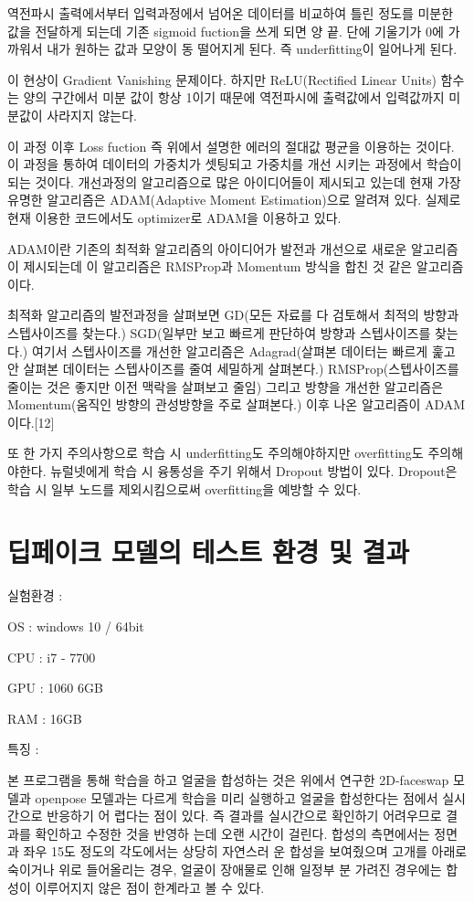 \documentclass{oblivoir}
\begin{document}
역전파시 출력에서부터 입력과정에서 넘어온 데이터를 비교하여 틀린 정도를 미분한 값을 전달하게 되는데 기존 sigmoid fuction을 쓰게 되면 양 끝. 단에 기울기가 0에 가까워서 내가 원하는 값과 모양이 동 떨어지게 된다. 즉 underfitting이 일어나게 된다.

이 현상이 Gradient Vanishing 문제이다. 하지만 ReLU(Rectified Linear Units) 함수는 양의 구간에서 미분 값이 항상 1이기 때문에 역전파시에 출력값에서 입력값까지 미분값이 사라지지 않는다.

이 과정 이후 Loss fuction 즉 위에서 설명한 에러의 절대값 평균을 이용하는 것이다. 이 과정을 통하여 데이터의 가중치가 셋팅되고 가중치를 개선 시키는 과정에서 학습이 되는 것이다. 개선과정의 알고리즘으로 많은 아이디어들이 제시되고 있는데 현재 가장 유명한 알고리즘은 ADAM(Adaptive Moment Estimation)으로 알려져 있다. 실제로 현재 이용한 코드에서도 optimizer로 ADAM을 이용하고 있다.

ADAM이란 기존의 최적화 알고리즘의 아이디어가 발전과 개선으로 새로운 알고리즘이 제시되는데 이 알고리즘은 RMSProp과 Momentum 방식을 합친 것 같은 알고리즘이다.

최적화 알고리즘의 발전과정을 살펴보면 GD(모든 자료를 다 검토해서 최적의 방향과 스텝사이즈를 찾는다.) SGD(일부만 보고 빠르게 판단하여 방향과 스텝사이즈를 찾는다.) 여기서 스텝사이즈를 개선한 알고리즘은 Adagrad(살펴본 데이터는 빠르게 훑고 안 살펴본 데이터는 스텝사이즈를 줄여 세밀하게 살펴본다.) RMSProp(스텝사이즈를 줄이는 것은 좋지만 이전 맥락을 살펴보고 줄임) 그리고 방향을 개선한 알고리즘은 Momentum(움직인 방향의 관성방향을 주로 살펴본다.) 이후 나온 알고리즘이 ADAM이다.[12]

또 한 가지 주의사항으로 학습 시 underfitting도 주의해야하지만 overfitting도 주의해야한다. 뉴럴넷에게 학습 시 융통성을 주기 위해서 Dropout 방법이 있다. Dropout은 학습 시 일부 노드를 제외시킴으로써 overfitting을 예방할 수 있다.

\section{ 딥페이크 모델의 테스트 환경 및 결과}

실험환경 :

OS : windows 10 / 64bit

CPU : i7 - 7700

GPU : 1060 6GB

RAM : 16GB

특징 :

 본 프로그램을 통해 학습을 하고 얼굴을 합성하는 것은 위에서 연구한 2D-faceswap 모델과  openpose 모델과는 다르게 학습을 미리 실행하고 얼굴을 합성한다는 점에서 실시간으로 반응하기 어 렵다는 점이 있다. 즉 결과를 실시간으로 확인하기 어려우므로 결과를 확인하고 수정한 것을 반영하 는데 오랜 시간이 걸린다. 합성의 측면에서는 정면과 좌우 15도 정도의 각도에서는 상당히 자연스러 운 합성을 보여줬으며 고개를 아래로 숙이거나 위로 들어올리는 경우, 얼굴이 장애물로 인해 일정부 분 가려진 경우에는 합성이 이루어지지 않은 점이 한계라고 볼 수 있다.
\end{document}
